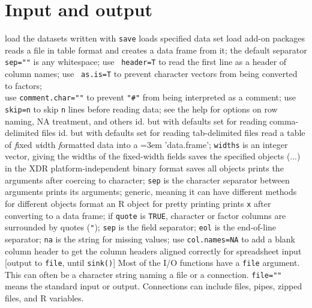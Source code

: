 \section{Input and output}{}
	{load the datasets written with {\tt save}}
	{loads specified data set}
	{load add-on packages}
	{reads a file in table format and creates a data frame
    from it; the default separator {\tt sep=""} is any whitespace; use {\tt
        header=T} to read the first line as a header of column names; use {\tt
        as.is=T} to prevent character vectors from being converted to factors;\\
    use {\tt comment.char=""} to prevent {\tt "\#"} from being interpreted as a
    comment; use {\tt skip=n} to skip {\tt n} lines before reading data; see
    the help for options on row naming, NA treatment, and others}
	{id. but with defaults set for reading comma-delimited files}
	{id. but with defaults set for reading tab-delimited files}
	{
    read a table of {\it f}ixed {\it w}idth {\it f}ormatted data into a
    \emergencystretch=3em 'data.frame'; {\tt widths} is an integer vector,
    giving the widths of the fixed-width fields}
	{saves the specified objects (...) in the XDR
    platform-independent binary format}
	{saves all objects}
	{prints the arguments after
    coercing to character; {\tt sep} is the character separator between
    arguments}
	{prints its arguments; generic, meaning it can
    have different methods for different objects}
	{format an R object for pretty printing}
	{prints {\tt x} after converting to a data frame; if {\tt quote} is {\tt TRUE}, character or factor columns are surrounded by quotes
    ({\tt "}); {\tt sep} is the field separator; {\tt eol} is the
    end-of-line separator; {\tt na} is the string for missing values;
    use {\tt col.names=NA} to add a blank column header to get the
    column headers aligned correctly for spreadsheet input}
	{[output to {\tt file}, until {\tt sink()}] Most
    of the I/O functions have a {\tt file} argument. This can often be a
    character string naming a file or a connection.  {\tt file=""} means
    the standard input or output. Connections can include files, pipes,
    zipped files, and R variables.}

